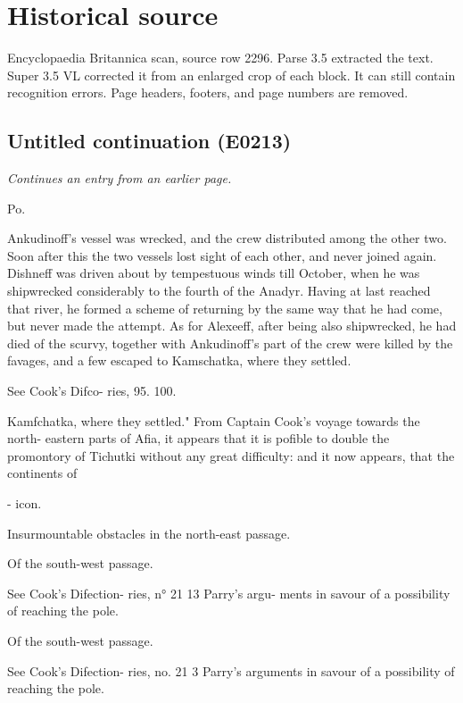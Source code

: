 \documentclass{article}
\begin{document}
\section*{Historical source}
Encyclopaedia Britannica scan, source row 2296. Parse 3.5 extracted the text. Super 3.5 VL corrected it from an enlarged crop of each block. It can still contain recognition errors.
Page headers, footers, and page numbers are removed.

\subsection*{Untitled continuation (E0213)}
\textit{Continues an entry from an earlier page.}

Po.

Ankudinoff's vessel was wrecked, and the crew distributed among the other two. Soon after this the two vessels lost sight of each other, and never joined again. Dishneff was driven about by tempestuous winds till October, when he was shipwrecked considerably to the fourth of the Anadyr. Having at last reached that river, he formed a scheme of returning by the same way that he had come, but never made the attempt. As for Alexeeff, after being also shipwrecked, he had died of the scurvy, together with Ankudinoff's part of the crew were killed by the favages, and a few escaped to Kamschatka, where they settled.

See
Cook's
Difco-
ries, 95.
100.

Kamfchatka, where they settled."
From Captain Cook's voyage towards the north-
eastern parts of Afia, it appears that it is pofible to
double the promontory of Tichutki without any great
difficulty: and it now appears, that the continents of

- icon.

Insurmountable obstacles in the north-east passage.

Of the
south-west
passage.

See
Cook's
Difection-
ries, n° 21
13
Parry's
argu-
ments in
savour of
a possibility
of reaching
the pole.

Of the
south-west
passage.

See
Cook's
Difection-
ries, no. 21
3
Parry's
arguments in
savour of
a possibility
of reaching
the pole.
\end{document}
